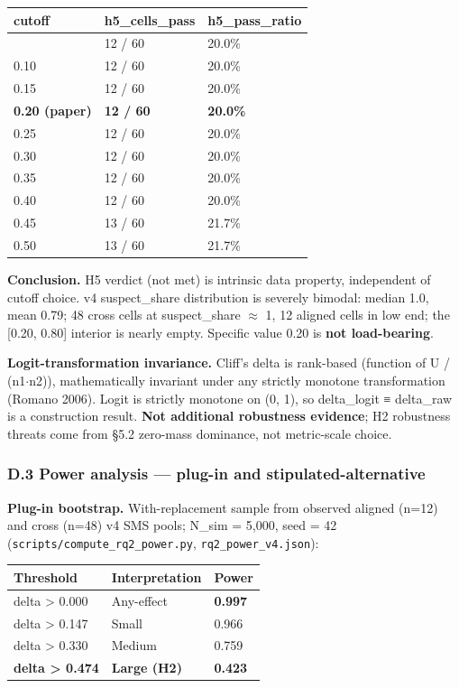 \documentclass[review,12pt,authoryear]{elsarticle}
\newcounter{none}                   %
\begin{document}
{\def\LTcaptype{none} %
\begin{longtable}[]{@{}lll@{}}
\toprule\noalign{}
cutoff & h5\_cells\_pass & h5\_pass\_ratio \\
\midrule\noalign{}
\endhead
\bottomrule\noalign{}
\endlastfoot
0.05 & 12 / 60 & 20.0\% \\
0.10 & 12 / 60 & 20.0\% \\
0.15 & 12 / 60 & 20.0\% \\
\textbf{0.20 (paper)} & \textbf{12 / 60} & \textbf{20.0\%} \\
0.25 & 12 / 60 & 20.0\% \\
0.30 & 12 / 60 & 20.0\% \\
0.35 & 12 / 60 & 20.0\% \\
0.40 & 12 / 60 & 20.0\% \\
0.45 & 13 / 60 & 21.7\% \\
0.50 & 13 / 60 & 21.7\% \\
\end{longtable}
}

\textbf{Conclusion.} H5 verdict (not met) is intrinsic data property,
independent of cutoff choice. v4 suspect\_share distribution is severely
bimodal: median 1.0, mean 0.79; 48 cross cells at suspect\_share $\approx$ 1, 12
aligned cells in low end; the {[}0.20, 0.80{]} interior is nearly empty.
Specific value 0.20 is \textbf{not load-bearing}.

\textbf{Logit-transformation invariance.} Cliff's delta is rank-based
(function of U / (n1$\cdot$n2)), mathematically invariant under any strictly
monotone transformation (Romano 2006). Logit is strictly monotone on (0,
1), so delta\_logit ≡ delta\_raw is a construction result. \textbf{Not
additional robustness evidence}; H2 robustness threats come from §5.2
zero-mass dominance, not metric-scale choice.

\subsubsection{D.3 Power analysis --- plug-in and
stipulated-alternative}\label{d.3-power-analysis-plug-in-and-stipulated-alternative}

\textbf{Plug-in bootstrap.} With-replacement sample from observed
aligned (n=12) and cross (n=48) v4 SMS pools; N\_sim = 5,000, seed = 42
(\texttt{scripts/compute\_rq2\_power.py}, \texttt{rq2\_power\_v4.json}):

{\def\LTcaptype{none} %
\begin{longtable}[]{@{}lll@{}}
\toprule\noalign{}
Threshold & Interpretation & Power \\
\midrule\noalign{}
\endhead
\bottomrule\noalign{}
\endlastfoot
delta \textgreater{} 0.000 & Any-effect & \textbf{0.997} \\
delta \textgreater{} 0.147 & Small & 0.966 \\
delta \textgreater{} 0.330 & Medium & 0.759 \\
\textbf{delta \textgreater{} 0.474} & \textbf{Large (H2)} &
\textbf{0.423} \\
\end{longtable}
}
\end{document}
